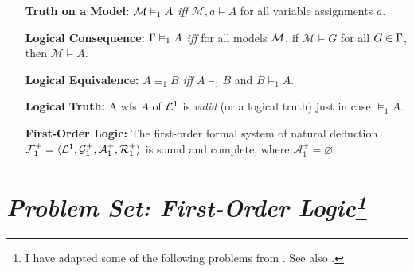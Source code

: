 \documentclass[a4paper, 11pt]{article} %
\begin{document}
\begin{enumerate}[leftmargin=1.2in] %
	\item[\bf Truth on a Model:] $\mathcal{M}\vDash_1 A$ \textit{iff} $\mathcal{M},\underline{a}\vDash A$ for all variable assignments $\underline{a}$.
	\item[\bf Logical Consequence:] $\Gamma\vDash_1 A$ \textit{iff} for all models $\mathcal{M}$, if $\mathcal{M}\vDash G$ for all $G\in\Gamma$, then $\mathcal{M}\vDash A$.
	\item[\bf Logical Equivalence:] $A\equiv_1 B$ \textit{iff} $A\vDash_1 B$ and $B\vDash_1 A$.
	\item[\bf Logical Truth:] A wfs $A$ of $\mathcal{L}^1$ is \textit{valid} (or a logical truth) just in case $\vDash_1 A$.
	\item[\bf First-Order Logic:] The first-order formal system of natural deduction $\mathcal{F}_1^+=\langle\mathcal{L}^1,\mathcal{G}_1^+,\mathcal{A}_1^+,\mathcal{R}_1^+\rangle$ is sound and complete, where $\mathcal{A}_1^+=\varnothing$.
\end{enumerate}





\section*{\it Problem Set: First-Order Logic\footnote{I have adapted some of the following problems from \citet{Carr2013}. See also \citet{Halbach2010}.}}
\end{document}
